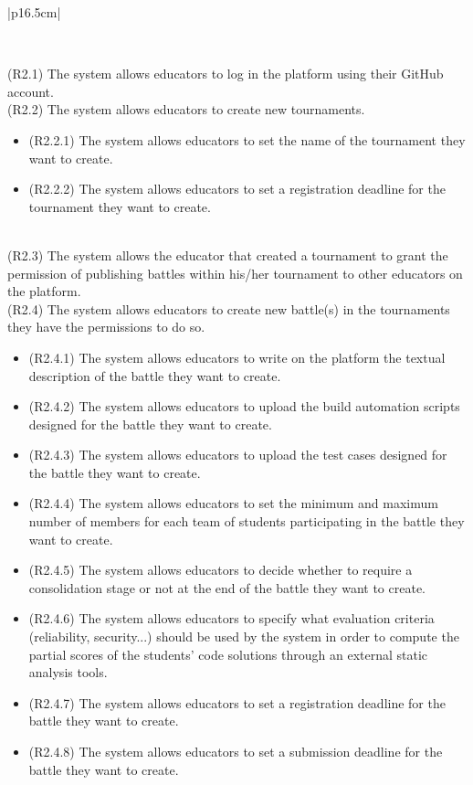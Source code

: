 \begin{longtable}{|p{16.5cm}|}
	\caption*{Requirements for Goal G2}\\
	\hline

(R2.1) The system allows educators to log in the platform using their GitHub account. \\
\hline
(R2.2) The system allows educators to create new tournaments.  

\begin{minipage}{\linewidth}
	\begin{itemize}[nosep]		
		\item (R2.2.1) The system allows educators to set the name of the tournament they want to create.
		\item (R2.2.2) The system allows educators to set a registration deadline for the tournament they want to create.\\
	\end{itemize}
\end{minipage}
\\
\hline
(R2.3) The system allows the educator that created a tournament to grant the permission of publishing battles within his/her tournament to other educators on the platform. \\
\hline
(R2.4) The system allows educators to create new battle(s) in the tournaments they have the permissions to do so.

\begin{minipage}{\linewidth}
	\begin{itemize}[nosep]
		\item (R2.4.1) The system allows educators to write on the platform the textual description of the battle they want to create.  
		\item (R2.4.2) The system allows educators to upload the build automation scripts designed for the battle they want to create.
		\item (R2.4.3) The system allows educators to upload the test cases designed for the battle they want to create.
		\item (R2.4.4) The system allows educators to set the minimum and maximum number of members for each team of students participating in the battle they want to create. 
		\item (R2.4.5) The system allows educators to decide whether to require a consolidation stage or not at the end of the battle they want to create. 
		\item (R2.4.6) The system allows educators to specify what evaluation criteria (reliability, security...) should be used by the system in order to compute the partial scores of the students' code solutions through an external static analysis tools. 
		\item (R2.4.7) The system allows educators to set a registration deadline for the battle they want to create.
		\item (R2.4.8) The system allows educators to set a submission deadline for the battle they want to create.  \\
	\end{itemize}
\end{minipage}\\
\hline


\end{longtable}
